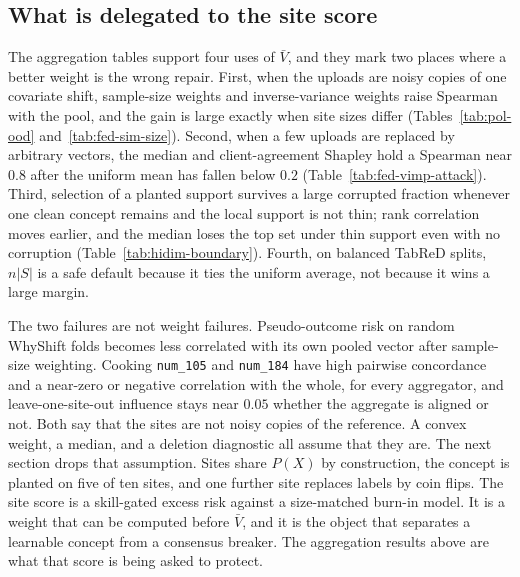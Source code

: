 \subsection{What is delegated to the site score}
\label{sec:handoff}

The aggregation tables support four uses of $\bar V$, and they mark two
places where a better weight is the wrong repair.
First, when the uploads are noisy copies of one covariate shift, sample-size
weights and inverse-variance weights raise Spearman with the pool, and the
gain is large exactly when site sizes differ
(Tables~\ref{tab:pol-ood} and~\ref{tab:fed-sim-size}).
Second, when a few uploads are replaced by arbitrary vectors, the median and
client-agreement Shapley hold a Spearman near $0.8$ after the uniform mean
has fallen below $0.2$
(Table~\ref{tab:fed-vimp-attack}).
Third, selection of a planted support survives a large corrupted fraction
whenever one clean concept remains and the local support is not thin; rank
correlation moves earlier, and the median loses the top set under thin
support even with no corruption
(Table~\ref{tab:hidim-boundary}).
Fourth, on balanced TabReD splits, $n|S|$ is a safe default because it ties
the uniform average, not because it wins a large margin.

The two failures are not weight failures.
Pseudo-outcome risk on random WhyShift folds becomes less correlated with
its own pooled vector after sample-size weighting.
Cooking \texttt{num\_105} and \texttt{num\_184} have high pairwise
concordance and a near-zero or negative correlation with the whole, for
every aggregator, and leave-one-site-out influence stays near $0.05$
whether the aggregate is aligned or not.
Both say that the sites are not noisy copies of the reference.
A convex weight, a median, and a deletion diagnostic all assume that they
are.
The next section drops that assumption.
Sites share $P(X)$ by construction, the concept is planted on five of ten
sites, and one further site replaces labels by coin flips.
The site score is a skill-gated excess risk against a size-matched burn-in
model.
It is a weight that can be computed before $\bar V$, and it is the object
that separates a learnable concept from a consensus breaker.
The aggregation results above are what that score is being asked to protect.



